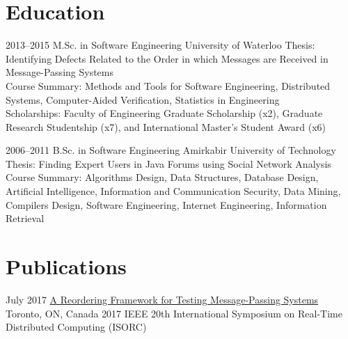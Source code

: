 \documentclass[]{cv-style}                     %
\begin{document}

\section{Education}

\begin{entrylist}

  \entry
  {\small 2013--2015}
  {M.Sc. in Software Engineering {\normalfont [GPA: 87.80/100]}}
  {University of Waterloo}
  {Thesis: Identifying Defects Related to the Order in which Messages are Received in Message-Passing Systems \\
   Course Summary: Methods and Tools for Software Engineering, Distributed Systems, Computer-Aided Verification, Statistics in Engineering \\
   Scholarships: Faculty of Engineering Graduate Scholarship (x2), Graduate Research Studentship (x7), and International Master's Student Award (x6)}

  \entry
  {\small 2006--2011}
  {B.Sc. in Software Engineering {\normalfont [GPA: 16.69/20]}}
  {Amirkabir University of Technology}
  {Thesis: Finding Expert Users in Java Forums using Social Network Analysis \\
   Course Summary: Algorithms Design, Data Structures, Database Design, Artificial Intelligence, Information and Communication Security, Data Mining, Compilers Design, Software Engineering, Internet Engineering, Information Retrieval}

\end{entrylist}



\newpage
\section{Publications}

\begin{entrylist}

  \entry
  {\small July 2017}
  {\href{http://ieeexplore.ieee.org/abstract/document/7964877}{A Reordering Framework for Testing Message-Passing Systems}}
  {Toronto, ON, Canada}
  {\small{2017 IEEE 20th International Symposium on Real-Time Distributed Computing (ISORC)}}

\end{entrylist}
\end{document}
